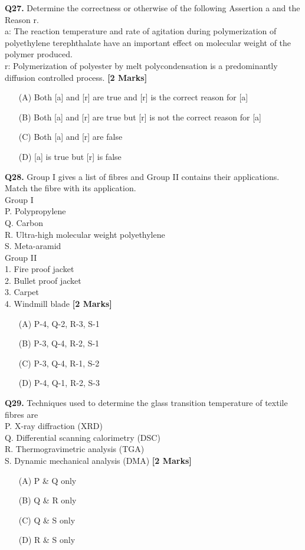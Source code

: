 \documentclass[11pt]{article}
\newcommand{\questionb}[2]{
    \noindent\textbf{Q#2.} #1 \hfill \textbf{[2 Marks]}
}
\begin{document}
\questionb{Determine the correctness or otherwise of the following Assertion a and the Reason r. \\
a: The reaction temperature and rate of agitation during polymerization of polyethylene terephthalate have an important effect on molecular weight of the polymer produced. \\
r: Polymerization of polyester by melt polycondensation is a predominantly diffusion controlled process.}{27}
\begin{enumerate}
    \item[(A)] Both [a] and [r] are true and [r] is the correct reason for [a]
    \item[(B)] Both [a] and [r] are true but [r] is not the correct reason for [a]
    \item[(C)] Both [a] and [r] are false
    \item[(D)] [a] is true but [r] is false
\end{enumerate}
\vspace{0.5cm}

\questionb{Group I gives a list of fibres and Group II contains their applications. Match the fibre with its application. \\
Group I \\
P. Polypropylene \\
Q. Carbon \\
R. Ultra-high molecular weight polyethylene \\
S. Meta-aramid \\
Group II \\
1. Fire proof jacket \\
2. Bullet proof jacket \\
3. Carpet \\
4. Windmill blade}{28}
\begin{enumerate}
    \item[(A)] P-4, Q-2, R-3, S-1
    \item[(B)] P-3, Q-4, R-2, S-1
    \item[(C)] P-3, Q-4, R-1, S-2
    \item[(D)] P-4, Q-1, R-2, S-3
\end{enumerate}
\vspace{0.5cm}

\questionb{Techniques used to determine the glass transition temperature of textile fibres are \\
P. X-ray diffraction (XRD) \\
Q. Differential scanning calorimetry (DSC) \\
R. Thermogravimetric analysis (TGA) \\
S. Dynamic mechanical analysis (DMA)}{29}
\begin{enumerate}
    \item[(A)] P \& Q only
    \item[(B)] Q \& R only
    \item[(C)] Q \& S only
    \item[(D)] R \& S only
\end{enumerate}
\vspace{0.5cm}
\end{document}
